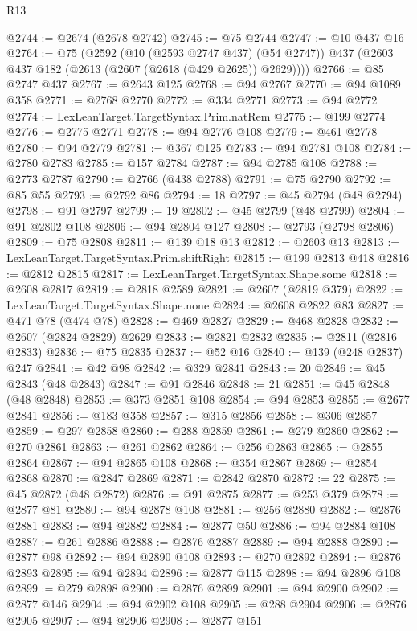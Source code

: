 \begin{lexlean}{R13}
\begin{coremodule}
@2744 := @2674 (@2678 @2742)
@2745 := @75 @2744
@2747 := @10 @437 @16
@2764 := @75
    (@2592
      (@10 (@2593 @2747 @437) (@54 @2747))
      @437
      (@2603 @437 @182 (@2613 (@2607 (@2618 (@429 @2625)) @2629))))
@2766 := @85 @2747 @437
@2767 := @2643 @125
@2768 := @94 @2767
@2770 := @94 @1089 @358
@2771 := @2768 @2770
@2772 := @334 @2771
@2773 := @94 @2772
@2774 := LexLeanTarget.TargetSyntax.Prim.natRem
@2775 := @199 @2774
@2776 := @2775 @2771
@2778 := @94 @2776 @108
@2779 := @461 @2778
@2780 := @94 @2779
@2781 := @367 @125
@2783 := @94 @2781 @108
@2784 := @2780 @2783
@2785 := @157 @2784
@2787 := @94 @2785 @108
@2788 := @2773 @2787
@2790 := @2766 (@438 @2788)
@2791 := @75 @2790
@2792 := @85 @55
@2793 := @2792 @86
@2794 := 18
@2797 := @45 @2794 (@48 @2794)
@2798 := @91 @2797
@2799 := 19
@2802 := @45 @2799 (@48 @2799)
@2804 := @91 @2802 @108
@2806 := @94 @2804 @127
@2808 := @2793 (@2798 @2806)
@2809 := @75 @2808
@2811 := @139 @18 @13
@2812 := @2603 @13
@2813 := LexLeanTarget.TargetSyntax.Prim.shiftRight
@2815 := @199 @2813 @418
@2816 := @2812 @2815
@2817 := LexLeanTarget.TargetSyntax.Shape.some
@2818 := @2608 @2817
@2819 := @2818 @2589
@2821 := @2607 (@2819 @379)
@2822 := LexLeanTarget.TargetSyntax.Shape.none
@2824 := @2608 @2822 @83
@2827 := @471 @78 (@474 @78)
@2828 := @469 @2827
@2829 := @468 @2828
@2832 := @2607 (@2824 @2829) @2629
@2833 := @2821 @2832
@2835 := @2811 (@2816 @2833)
@2836 := @75 @2835
@2837 := @52 @16
@2840 := @139 (@248 @2837) @247
@2841 := @42 @98
@2842 := @329 @2841
@2843 := 20
@2846 := @45 @2843 (@48 @2843)
@2847 := @91 @2846
@2848 := 21
@2851 := @45 @2848 (@48 @2848)
@2853 := @373 @2851 @108
@2854 := @94 @2853
@2855 := @2677 @2841
@2856 := @183 @358
@2857 := @315 @2856
@2858 := @306 @2857
@2859 := @297 @2858
@2860 := @288 @2859
@2861 := @279 @2860
@2862 := @270 @2861
@2863 := @261 @2862
@2864 := @256 @2863
@2865 := @2855 @2864
@2867 := @94 @2865 @108
@2868 := @354 @2867
@2869 := @2854 @2868
@2870 := @2847 @2869
@2871 := @2842 @2870
@2872 := 22
@2875 := @45 @2872 (@48 @2872)
@2876 := @91 @2875
@2877 := @253 @379
@2878 := @2877 @81
@2880 := @94 @2878 @108
@2881 := @256 @2880
@2882 := @2876 @2881
@2883 := @94 @2882
@2884 := @2877 @50
@2886 := @94 @2884 @108
@2887 := @261 @2886
@2888 := @2876 @2887
@2889 := @94 @2888
@2890 := @2877 @98
@2892 := @94 @2890 @108
@2893 := @270 @2892
@2894 := @2876 @2893
@2895 := @94 @2894
@2896 := @2877 @115
@2898 := @94 @2896 @108
@2899 := @279 @2898
@2900 := @2876 @2899
@2901 := @94 @2900
@2902 := @2877 @146
@2904 := @94 @2902 @108
@2905 := @288 @2904
@2906 := @2876 @2905
@2907 := @94 @2906
@2908 := @2877 @151

\end{coremodule}
\end{lexlean}
